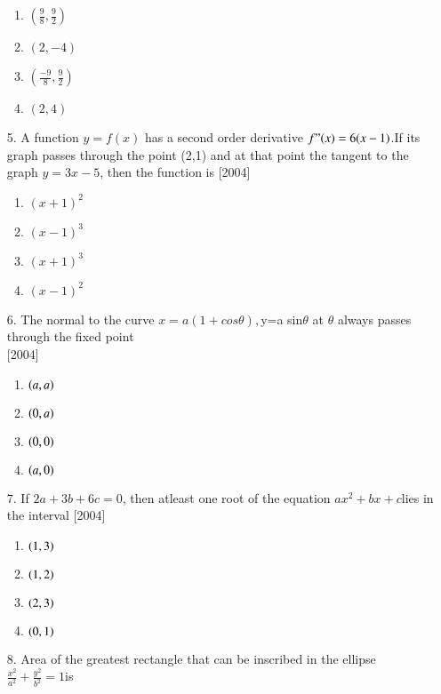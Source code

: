 \documentclass[journal,12pt,twocolumn]{IEEEtran}
\theoremstyle{remark}
\begin{document}
\begin{enumerate}
								\begin{enumerate}
								    \item $(\frac{9}{8},\frac{9}{2})$
								        \item $(2,-4)$
									    \item $(\frac{-9}{8},\frac{9}{2})$
									        \item $(2,4)$
										\end{enumerate}
										\item[5.]A function $y=f(x)$ has a second order derivative $f"(x)=6(x-1)$.If its graph passes through the point (2,1) and at that point the tangent to the graph $y=3x-5$, then the function is \hfill{[2004]}
										\begin{enumerate}
										    \item $(x+1)^2$
										        \item $(x-1)^3$
											    \item $(x+1)^3$
											        \item $(x-1)^2$
												\end{enumerate}
												\item[6.]The normal to the curve $x=a(1+cos\theta)$$, $y=a sin$\theta$ at $\theta$ always passes through the fixed point\\ \hfill{[2004]}
												\begin{enumerate}
												    \item $\brak{a,a}$
												        \item $\brak{0,a}$
													    \item $\brak{0,0}$
													        \item $\brak{a,0}$
														\end{enumerate}
														\item[7.]If $2a+3b+6c=0$, then atleast one root of the equation $ax^2+bx+c$lies in the interval \hfill{[2004]}
														\begin{enumerate}
														    \item $\brak{1,3}$
														        \item $\brak{1,2}$
															    \item $\brak{2,3}$
															        \item $\brak{0,1}$
																\end{enumerate}  
																 \item[8.]Area of the greatest rectangle that can be inscribed in the ellipse $\frac{x^2}{a^2}+\frac{y^2}{b^2}=1$is
$$
\end{enumerate}
\end{document}
